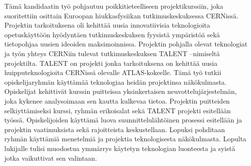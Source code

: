 \documentclass[english,12pt,a4paper,pdftex]{article}
\begin{document}

\begin{otherlanguage}{finnish}
\begin{abstractpage}[finnish]

  Tämä kandidaatin työ pohjautuu poikkitieteelliseen projektikurssiin, joka suoritettiin osittain Euroopan hiukkasfysiikan tutkimuskeskuksessa CERNissä. Projektin tarkoituksena oli kehittää uusia innovatiivisia teknologioita opetuskäyttöön hyödyntäen tutkimuskeskuksen fyysistä ympäristöä sekä tietopohjaa uusien ideoiden maksimoinnissa. Projektin pohjalla olevat teknologiat ja työn yhteys CERNiin tulevat tutkimuskeskuksen TALENT --nimiseltä projektilta. TALENT on projekti jonka tarkoituksena on kehittää uusia huipputeknologioita CERNissä olevalle ATLAS-kokeelle. Tämä työ tutkii opiskelijaryhmän käyttämää teknologiaa heidän projektinsa näkökulmasta. Opiskelijat kehittivät kurssin puitteissa yksinkertaisen neuvottelujärjestelmän, joka kykenee analysoimaan sen kautta kulkevaa tietoa. Projektin puitteiden selkiyttämiseksi kurssi, ryhmän erikoisalat sekä TALENT projekti esitellään työssä. Opiskelijoiden käyttämä luova suunnittelulähtöinen prosessi esitellään ja projektin vaatimuksista sekä rajoitteista keskustellaan. Lopuksi pohditaan ryhmän käyttämiä menetelmiä ja projektia teknologisesta näkökulmasta. Lopulta lukijalle tulisi muodostua ymmärrys käytetyn teknologian luonteesta ja syistä jotka vaikuttivat sen valintaan.
  
  
\end{abstractpage}
\end{otherlanguage}
\newpage
%




\end{document}
